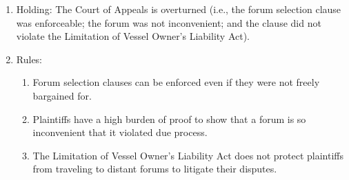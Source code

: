 \begin{enumerate}
\begin{enumerate}
    \end{enumerate}
    \item Holding: The Court of Appeals is overturned (i.e., the forum selection clause was enforceable; the forum was not inconvenient; and the clause did not violate the Limitation of Vessel Owner's Liability Act).
    \item Rules:
    \begin{enumerate}
        \item Forum selection clauses can be enforced even if they were not freely bargained for.
        \item Plaintiffs have a high burden of proof to show that a forum is so inconvenient that it violated due process.
        \item The Limitation of Vessel Owner's Liability Act does not protect plaintiffs from traveling to distant forums to litigate their disputes.
    \end{enumerate}
\end{enumerate}

